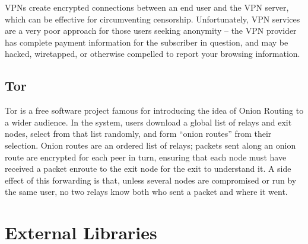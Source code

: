 \documentclass{article}
\begin{document}
VPNs create encrypted connections between an end user and the VPN
server, which can be effective for circumventing
censorship. Unfortunately, VPN services are a very poor approach for
those users seeking anonymity – the VPN provider has complete payment
information for the subscriber in question, and may be hacked,
wiretapped, or otherwise compelled to report your browsing
information.

\subsection{Tor}

Tor\cite{TOR} is a free software project famous for introducing the
idea of Onion Routing to a wider audience. In the system, users
download a global list of relays and exit nodes, select from that list
randomly, and form ``onion routes'' from their selection. Onion routes
are an ordered list of relays; packets sent along an onion route are
encrypted for each peer in turn, ensuring that each node must have
received a packet enroute to the exit node for the exit to understand
it. A side effect of this forwarding is that, unless several nodes are
compromised or run by the same user, no two relays know both who sent
a packet and where it went.








\section{External Libraries}
\label{sec:external-libraries}
\end{document}
